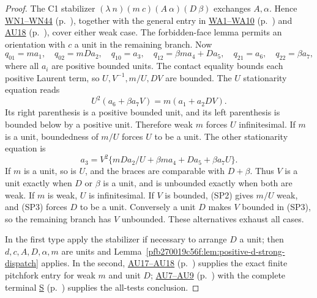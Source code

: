 \begin{proof}
The C1 stabilizer
$(\lambda\ n)(m\ c)(A\ \alpha)(D\ \beta)$ exchanges $A,\alpha$.
Hence \hyperref[component:p0db05df21ad1]{WN1--WN44} (p.~\pageref{component:p0db05df21ad1}), together with the general entry in \hyperref[component:p3a3949869b9e]{WA1--WA10} (p.~\pageref{component:p3a3949869b9e}) and \hyperref[component:pc0b2849f8d09]{AU18} (p.~\pageref{component:pc0b2849f8d09}), cover either weak case. The forbidden-face lemma permits an orientation with $c$ a
unit in the remaining branch. Now
\[
 q_{01}=ma_1,\quad q_{02}=mDa_2,\quad q_{10}=a_3,
 \quad q_{12}=\beta m a_4+Da_5,\quad q_{21}=a_6,
 \quad q_{22}=\beta a_7,
\]
where all $a_i$ are positive bounded units. The contact equality
bounds each positive Laurent term, so $U,V^{-1},m/U,DV$ are bounded.
The $U$ stationarity equation reads
\[
 U^2(a_6+\beta a_7V)=m(a_1+a_2DV).               \tag{SP2}
\]
Its right parenthesis is a positive bounded unit, and its left
parenthesis is bounded below by a positive unit. Therefore weak
$m$ forces $U$ infinitesimal. If $m$ is a unit, boundedness of
$m/U$ forces $U$ to be a unit. The other stationarity equation is
\[
 a_3=V^2\{mDa_2/U+\beta ma_4+Da_5+\beta a_7U\}. \tag{SP3}
\]
If $m$ is a unit, so is $U$, and the braces are comparable with
$D+\beta$. Thus $V$ is a unit exactly when $D$ or $\beta$ is a
unit, and is unbounded exactly when both are weak. If $m$ is weak,
$U$ is infinitesimal. If $V$ is bounded, (SP2) gives $m/U$ weak,
and (SP3) forces $D$ to be a unit. Conversely a unit $D$ makes
$V$ bounded in (SP3), so the remaining branch has $V$ unbounded.
These alternatives exhaust all cases.

In the first type apply the stabilizer if necessary to arrange
$D$ a unit; then $d,c,A,D,\alpha,m$ are units and
Lemma~\ref{pfb270019c56f:lem:positive-d-strong-dispatch} applies. In the second,
\hyperref[component:pc0b2849f8d09]{AU17--AU18} (p.~\pageref{component:pc0b2849f8d09}) supplies the exact finite pitchfork entry for weak $m$ and unit $D$; \hyperref[component:pc0b2849f8d09]{AU7--AU9} (p.~\pageref{component:pc0b2849f8d09}) with the complete terminal \hyperref[component:pfb0cf454f653]{S} (p.~\pageref{component:pfb0cf454f653}) supplies the all-tests conclusion.
\end{proof}


